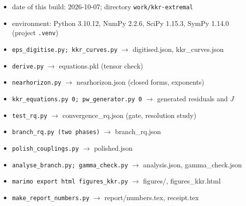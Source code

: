 \begin{itemize}\itemsep0pt
\item date of this build: 2026-10-07; directory \texttt{work/kkr-extremal}
\item environment: Python 3.10.12, NumPy 2.2.6, SciPy 1.15.3, SymPy 1.14.0 (project \texttt{.venv})
\item \texttt{eps\_digitise.py; kkr\_curves.py} $\to$ digitised.json, kkr\_curves.json
\item \texttt{derive.py} $\to$ equations.pkl (tensor check)
\item \texttt{nearhorizon.py} $\to$ nearhorizon.json (closed forms, exponents)
\item \texttt{kkr\_equations.py 0; pw\_generator.py 0} $\to$ generated residuals and $J$
\item \texttt{test\_rq.py} $\to$ convergence\_rq.json (gate, resolution study)
\item \texttt{branch\_rq.py (two phases)} $\to$ branch\_rq.json
\item \texttt{polish\_couplings.py} $\to$ polished.json
\item \texttt{analyse\_branch.py; gamma\_check.py} $\to$ analysis.json, gamma\_check.json
\item \texttt{marimo export html figures\_kkr.py} $\to$ figures/, figures\_kkr.html
\item \texttt{make\_report\_numbers.py} $\to$ report/numbers.tex, receipt.tex
\end{itemize}
